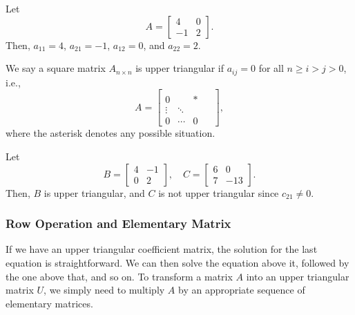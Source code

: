 \documentclass[11pt]{article}
\theoremstyle{break}
\theoremstyle{no_label}
\numberwithin{equation}{section}
\begin{document}
\begin{example}
    Let $$A=\begin{bmatrix}
        4 & 0 \\ -1 & 2
    \end{bmatrix}.$$ Then, $a_{11}=4$, $a_{21}=-1$, $a_{12}=0$, and $a_{22}=2$.
\end{example}

\begin{definition}
    We say a square matrix $A_{n\times n}$ is upper triangular if $a_{ij}=0$ for all $n\ge i>j>0$, i.e., \begin{equation*}
        A=\begin{bmatrix}
            & & &\\
           0 & & \ast &\\
           \vdots  & \ddots &  \\
           0 & \cdots & 0 & \ \ 
        \end{bmatrix},
    \end{equation*}
    where the asterisk denotes any possible situation.
\end{definition}

\begin{example}
    Let $$B=\begin{bmatrix}
        4 & -1 \\ 0 & 2
    \end{bmatrix},\quad C=\begin{bmatrix}
        6 & 0 \\ 7 & -13
    \end{bmatrix}.$$ Then, $B$ is upper triangular, and $C$
    is not upper triangular since $c_{21}\ne0$.
\end{example}

\subsubsection*{Row Operation and Elementary Matrix}

If we have an upper triangular coefficient matrix, the solution for the last equation is straightforward. We can then solve the equation above it, followed by the one above that, and so on. To transform a matrix $A$ into an upper triangular matrix $U$, we simply need to multiply $A$ by an appropriate sequence of elementary matrices.
\end{document}
